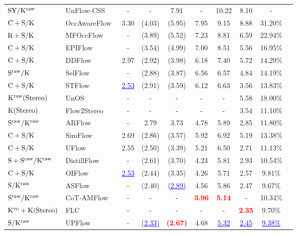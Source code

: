 \documentclass[lettersize,journal]{IEEEtran}
\begin{document}
\begin{table*}[t]
\begin{tabular}{llcccccccc}
		\midrule
		$\rm SY/K^{raw}$ & UnFlow-CSS~\cite{Meister:2018:UUL} & - & - & 7.91 & - & 10.22 & 8.10 & - \\
		$\rm C+S/K$ & OccAwareFlow~\cite{8578611} & 3.30 & (4.03) & (5.95) & 7.95 & 9.15 & 8.88 & 31.20\% \\
		$\rm R+S/K$ & MFOccFlow~\cite{Janai_2018_ECCV} & - & (3.89) & (5.52) & 7.23 & 8.81 & 6.59 & 22.94\% \\
		$\rm C+S/K$ & EPIFlow~\cite{8953885} & - & (3.54) & (4.99) & 7.00 & 8.51 & 5.56 & 16.95\% \\
		$\rm C+S/K$ & DDFlow~\cite{Liu:2019:DDFlow} & 2.97 & (2.92) & (3.98) & 6.18 & 7.40 & 5.72 & 14.29\% \\
		$\rm S^{raw}/K$ & SelFlow~\cite{Liu:2019:SelFlow} & - & (2.88) & (3.87) & 6.56 & 6.57 & 4.84 & 14.19\% \\
		$\rm C+S/K$ & STFlow~\cite{9201360} & \textcolor{blue}{\underline{2.53}} & (2.91) & (3.59) & 6.12 & 6.63 & 3.56 & 13.83\% \\
		$\rm K^{raw} (Stereo)$ & UnOS~\cite{Wang_2019_CVPR} & - & - & - & - & - & 5.58 & 18.00\% \\
		$\rm K (Stereo)$ & Flow2Stereo~\cite{Flow2Stereo} & - & - & - & - & - & 3.54 & 11.10\% \\
		$\rm S^{raw}/K^{raw}$ & ARFlow~\cite{Liu_2020_CVPR} & - & 2.79 & 3.73 & 4.78 & 5.89 & 2.85 & 11.80\% \\
		$\rm C+S/K$ & SimFlow~\cite{10.1007/978-3-030-58586-0_11} & 2.69 & (2.86) & (3.57) & 5.92 & 6.92 & 5.19 & 13.38\% \\
		$\rm C+S/K$ & UFlow~\cite{10.1007/978-3-030-58536-5_33} & 2.55 & (2.50) & (3.39) & 5.21 & 6.50 & 2.71 & 11.13\% \\
		$\rm S+S^{raw}/K^{raw}$ & DistillFlow~\cite{9444870} & - & (2.61) & (3.70) & 4.23 & 5.81 & 2.93 & 10.54\% \\
		$\rm C+S/K$ & OIFlow~\cite{9477059} & \textcolor{blue}{\underline{2.53}} & (2.44) & (3.35) & 4.26 & 5.71 & 2.57 & 9.81\% \\
		$\rm S/K^{raw}$ & ASFlow~\cite{9625946} & - & (2.40) & \textcolor{blue}{\underline{(2.89)}} & 4.56 & 5.86 & 2.47 & 9.67\% \\
		$\rm S^{raw}/K^{raw}$ & CoT-AMFlow~\cite{Wang_CoRL_2020} & - & - & - & \textcolor{red}{\textbf{3.96}} & \textcolor{red}{\textbf{5.14}} & - & 10.34\% \\
		$\rm K^{vo}+K (Stereo)$ & FLC~\cite{Chi_2021_CVPR} & - & - & - & - & - & \textcolor{red}{\textbf{2.35}} & 9.70\% \\
		$\rm S/K^{raw}$ & UPFlow~\cite{Luo_2021_CVPR} & - & \textcolor{blue}{\underline{(2.33)}} & \textcolor{red}{\textbf{(2.67)}} & 4.68 & \textcolor{blue}{\underline{5.32}} & \textcolor{blue}{\underline{2.45}} & \textcolor{blue}{\underline{9.38\%}} \\

\end{tabular}
\end{table*}
\end{document}
